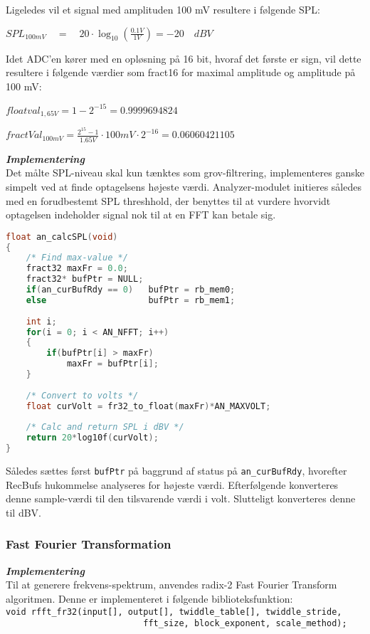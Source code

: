 Ligeledes vil et signal med amplituden 100 mV resultere i følgende SPL:
\begin{center}
${ SPL }_{ 100mV }\quad =\quad 20\cdot \log _{ 10 }{ \left( \frac { 0.1V }{ 1V }  \right)  } =-20\quad dBV$
\end{center}

Idet ADC'en kører med en opløsning på 16 bit, hvoraf det første er sign, vil dette resultere i følgende værdier som fract16 for maximal amplitude og amplitude på 100 mV:
\begin{center}
${ floatval }_{ 1,65V }=1-{ 2 }^{ -15 }=0.9999694824$ 
\end{center}
\begin{center}
$fractVal_{ 100mV }=\frac { { 2 }^{ 15 }-1 }{ 1.65V } \cdot 100mV\cdot { 2 }^{ -16 }=0.06060421105$
\end{center}

\textbf{\textit{Implementering}} \\
Det målte SPL-niveau skal kun tænktes som grov-filtrering, implementeres ganske simpelt ved at finde optagelsens højeste værdi. Analyzer-modulet initieres således med en forudbestemt SPL threshhold, der benyttes til at vurdere hvorvidt optagelsen indeholder signal nok til at en FFT kan betale sig.
\begin{lstlisting}[language=C,numbers=none]
float an_calcSPL(void)
{
    /* Find max-value */
    fract32 maxFr = 0.0;
    fract32* bufPtr = NULL;
    if(an_curBufRdy == 0)   bufPtr = rb_mem0;
    else                    bufPtr = rb_mem1;
	
    int i;
    for(i = 0; i < AN_NFFT; i++)
    {
        if(bufPtr[i] > maxFr)
            maxFr = bufPtr[i];
    }
    
    /* Convert to volts */
    float curVolt = fr32_to_float(maxFr)*AN_MAXVOLT;
	
    /* Calc and return SPL i dBV */
    return 20*log10f(curVolt);
}
\end{lstlisting}
Således sættes først \verb+bufPtr+ på baggrund af status på \verb+an_curBufRdy+, hvorefter RecBufs hukommelse analyseres for højeste værdi. Efterfølgende konverteres denne sample-værdi til den tilsvarende værdi i volt. Slutteligt konverteres denne til dBV.

\subsubsection{Fast Fourier Transformation}
\textbf{\textit{Implementering}} \\
Til at generere frekvens-spektrum, anvendes radix-2 Fast Fourier Transform algoritmen. Denne er implementeret i følgende biblioteksfunktion: \\
\verb+void rfft_fr32(input[], output[], twiddle_table[], twiddle_stride, + \\
\verb+                           fft_size, block_exponent, scale_method);+

